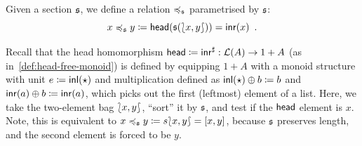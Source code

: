 \begin{definition}
    \label{def:least}
    Given a section $\mathfrak{s}$, we define a relation $\preccurlyeq_{\mathfrak{s}}$ parametrised by $\mathfrak{s}$:
    \[
        x \preccurlyeq_{\mathfrak{s}} y \mathrel{\coloneq} \operatorname{\mathsf{head}}(\mathfrak{s}({\lbag}{x, y}{\rbag})) = \operatorname{\mathsf{inr}}(x) \enspace.
    \]
\end{definition}
%
Recall that the head homomorphism $\operatorname{\mathsf{head}} \mathrel{\coloneq} {\operatorname{\mathsf{inr}}}^{\sharp} : \mathcal{L}(A) \to 1 + A$ (as in~\cref{def:head-free-monoid}) is defined by equipping $1 + A$ with a monoid structure with unit $e \mathrel{\coloneq} \operatorname{\mathsf{inl}}(\star)$ and multiplication defined as $\operatorname{\mathsf{inl}}(\star) \oplus b \mathrel{\coloneq} b$ and $\operatorname{\mathsf{inr}}(a) \oplus b \mathrel{\coloneq} \operatorname{\mathsf{inr}}(a)$, which picks out the first (leftmost) element of a list.
%
Here, we take the two-element bag ${\lbag}{x, y}{\rbag}$,
``sort'' it by $\mathfrak{s}$, and test if the $\operatorname{\mathsf{head}}$ element is $x$.
%
Note, this is equivalent to $x \preccurlyeq_{\mathfrak{s}} y \mathrel{\coloneq} s{\lbag}{x, y}{\rbag} = [x,y]$,
because $\mathfrak{s}$ preserves length, and the second element is forced to be $y$.
%


